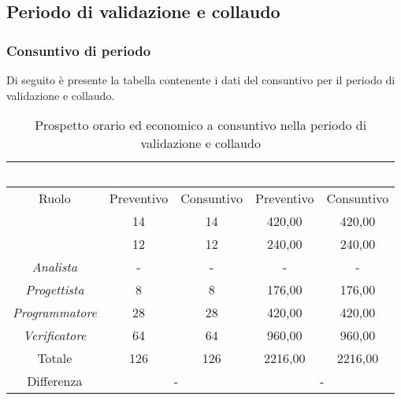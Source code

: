 \subsection{Periodo di validazione e collaudo}\label{ConsuntivoValidazione}
\subsubsection{Consuntivo di periodo}
Di seguito è presente la tabella contenente i dati del consuntivo per il periodo di validazione e collaudo.
\begin{table}[H]
	\centering
	\begin{tabular}{|c|c|c|c|c|}
		\rowcolor{darkblue} 
		&\multicolumn{2}{c|}{\textcolor{white}{Ore}}&\multicolumn{2}{c|}{\textcolor{white}{Costo in €}}\\ \hline
		Ruolo				&	Preventivo			&	Consuntivo		&	Preventivo	&	Consuntivo\\ \hline
		{\Responsabile}		&	14					&	14				&	420,00		&	420,00 \\ \hline
		{\Amministratore}	&	12					&	12				&	240,00		&	240,00 \\ \hline
		\textit{Analista}	&	-					&	-			&	-			&	-\\ \hline
		\textit{Progettista}& 	8				&	8			& 	176,00		&  	176,00 \\ \hline
		\textit{Programmatore}& 28					& 	28				& 	420,00		&  	420,00 \\ \hline
		\textit{Verificatore}&	64					&	64				&	960,00		&	960,00 \\ \hline
		Totale				&	126					&	126				&	2216,00		&	2216,00 \\ \hline
		Differenza			& 	\multicolumn{2}{c|}{-} 				&\multicolumn{2}{c|}{-}\\ \hline
	\end{tabular}
	\caption{Prospetto orario ed economico a consuntivo nella periodo di validazione e collaudo}
\end{table}
